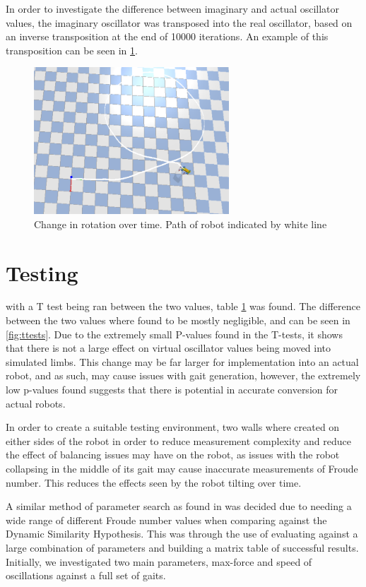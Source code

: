 In order to investigate the difference between imaginary and actual oscillator values, the imaginary oscillator was transposed into the real oscillator, based on an inverse transposition at the end of 10000 iterations. An example of this transposition can be seen in \ref{}.  

\begin{figure}
    \centering
    \includegraphics[width=0.65\textwidth]{USFD_Academic-_Report_LaTeX-Template/figures/rotation_over_time.png}
    \caption{Change in rotation over time. Path of robot indicated by white line}
    \label{fig:rotation}
\end{figure}

\section{Testing}
with a T test being ran between the two values, table \ref{} was found. The difference between the two values where found to be mostly negligible, and can be seen in \ref{fig:ttests}. Due to the extremely small P-values found in the T-tests, it shows that there is not a large effect on virtual oscillator values being moved into simulated limbs. This change may be far larger for implementation into an actual robot, and as such, may cause issues with gait generation, however, the extremely low p-values found suggests that there is potential in accurate conversion for actual robots. 

In order to create a suitable testing environment, two walls where created on either sides of the robot in order to reduce measurement complexity and reduce the effect of balancing issues may have on the robot, as issues with the robot collapsing in the middle of its gait may cause inaccurate measurements of Froude number. This reduces the effects seen by the robot tilting over time.

A similar method of parameter search as found in \cite{Rutishauser2008} was decided due to needing a wide range of different Froude number values when comparing against the Dynamic Similarity Hypothesis. This was through the use of evaluating against a large combination of parameters and building a matrix table of successful results. Initially, we investigated two main parameters, max-force and speed of oscillations against a full set of gaits. 

